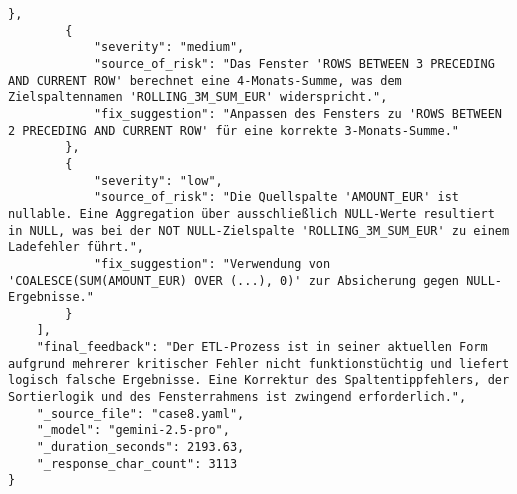 \begin{lstlisting}[caption={Ausgabe: Gemini 2.5 Pro Anwendungsfall 8 Konsistenzdurchlauf},label={gemini_case8_prompt2}]
        },
        {
            "severity": "medium",
            "source_of_risk": "Das Fenster 'ROWS BETWEEN 3 PRECEDING AND CURRENT ROW' berechnet eine 4-Monats-Summe, was dem Zielspaltennamen 'ROLLING_3M_SUM_EUR' widerspricht.",
            "fix_suggestion": "Anpassen des Fensters zu 'ROWS BETWEEN 2 PRECEDING AND CURRENT ROW' für eine korrekte 3-Monats-Summe."
        },
        {
            "severity": "low",
            "source_of_risk": "Die Quellspalte 'AMOUNT_EUR' ist nullable. Eine Aggregation über ausschließlich NULL-Werte resultiert in NULL, was bei der NOT NULL-Zielspalte 'ROLLING_3M_SUM_EUR' zu einem Ladefehler führt.",
            "fix_suggestion": "Verwendung von 'COALESCE(SUM(AMOUNT_EUR) OVER (...), 0)' zur Absicherung gegen NULL-Ergebnisse."
        }
    ],
    "final_feedback": "Der ETL-Prozess ist in seiner aktuellen Form aufgrund mehrerer kritischer Fehler nicht funktionstüchtig und liefert logisch falsche Ergebnisse. Eine Korrektur des Spaltentippfehlers, der Sortierlogik und des Fensterrahmens ist zwingend erforderlich.",
    "_source_file": "case8.yaml",
    "_model": "gemini-2.5-pro",
    "_duration_seconds": 2193.63,
    "_response_char_count": 3113
}
\end{lstlisting}

